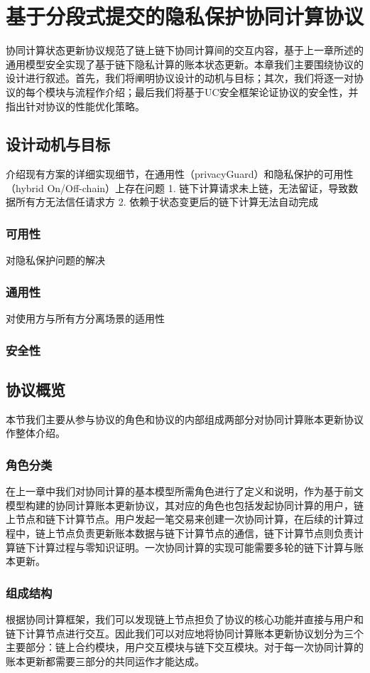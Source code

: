 \chapter{基于分段式提交的隐私保护协同计算协议}
协同计算状态更新协议规范了链上链下协同计算间的交互内容，基于上一章所述的通用模型安全实现了基于链下隐私计算的账本状态更新。本章我们主要围绕协议的设计进行叙述。首先，我们将阐明协议设计的动机与目标；其次，我们将逐一对协议的每个模块与流程作介绍；最后我们将基于UC安全框架论证协议的安全性，并指出针对协议的性能优化策略。
\section{设计动机与目标}
介绍现有方案的详细实现细节，在通用性（privacyGuard）和隐私保护的可用性（hybrid On/Off-chain）上存在问题
1. 链下计算请求未上链，无法留证，导致数据所有方无法信任请求方
2. 依赖于状态变更后的链下计算无法自动完成
\subsection{可用性}
对隐私保护问题的解决

\subsection{通用性}
对使用方与所有方分离场景的适用性

\subsection{安全性}


\section{协议概览}
本节我们主要从参与协议的角色和协议的内部组成两部分对协同计算账本更新协议作整体介绍。
\subsection{角色分类}
在上一章中我们对协同计算的基本模型所需角色进行了定义和说明，作为基于前文模型构建的协同计算账本更新协议，其对应的角色也包括发起协同计算的用户，链上节点和链下计算节点。用户发起一笔交易来创建一次协同计算，在后续的计算过程中，链上节点负责更新账本数据与链下计算节点的通信，链下计算节点则负责计算链下计算过程与零知识证明。一次协同计算的实现可能需要多轮的链下计算与账本更新。

\subsection{组成结构}
根据协同计算框架，我们可以发现链上节点担负了协议的核心功能并直接与用户和链下计算节点进行交互。因此我们可以对应地将协同计算账本更新协议划分为三个主要部分：链上合约模块，用户交互模块与链下交互模块。对于每一次协同计算的账本更新都需要三部分的共同运作才能达成。

